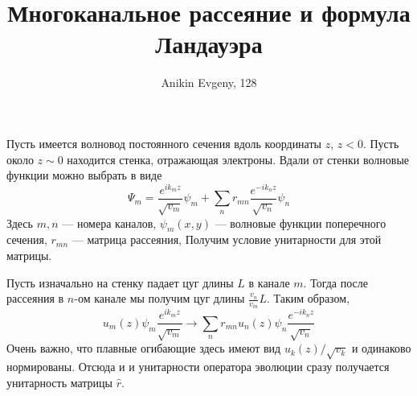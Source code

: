 \documentclass{article}
\title{Многоканальное рассеяние и формула Ландауэра}
\author{Anikin Evgeny, 128}
\begin{document}
\maketitle
Пусть имеется волновод постоянного сечения вдоль координаты $z$, $z < 0$. Пусть 
около $z \sim 0$ находится стенка, отражающая электроны. Вдали от стенки
волновые функции можно выбрать в виде
\begin{equation}
    \Psi_m = \frac{e^{ik_mz}}{\sqrt{v_m}}\psi_m + 
             \sum_n r_{mn} \frac{e^{-ik_nz}}{\sqrt{v_n}} \psi_n
\end{equation}
Здесь $m,n$ --- номера каналов, $\psi_m(x,y)$ --- волновые функции поперечного сечения,
$r_{mn}$ --- матрица рассеяния,  Получим условие унитарности
для этой матрицы. 

Пусть изначально на стенку падает цуг длины $L$ в канале $m$. 
Тогда после рассеяния в $n$-ом канале
мы получим цуг длины $\frac{v_n}{v_m}L$. Таким образом,
\begin{equation}
    u_m(z)\psi_m\frac{e^{ik_mz}}{\sqrt{v_m}} \to 
             \sum_n r_{mn} u_n(z) \psi_n \frac{e^{-ik_nz}}{\sqrt{v_n}} 
\end{equation}
Очень важно, что плавные огибающие здесь имеют вид $u_k(z)/\sqrt{v_k}$ и одинаково 
нормированы. Отсюда и и унитарности оператора эволюции сразу получается
унитарность матрицы $\hat{r}$.
\end{document}
